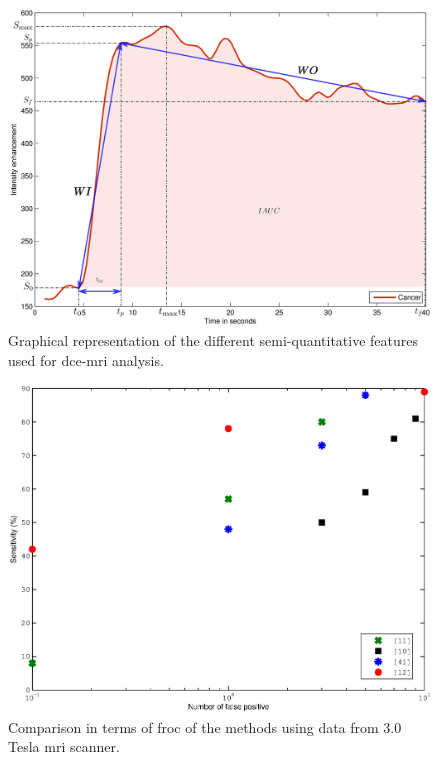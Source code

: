 
\begin{figure}
  \centering
  \includegraphics[width=.6\linewidth]{12_figures/figures/dce/dce_cancer_parameters.eps}
  \caption{Graphical representation of the different semi-quantitative features used for \ac{dce}-\ac{mri} analysis.}
  \label{fig:dceparam}
\end{figure}

\begin{figure}
  \centering
  \includegraphics[width=.5\linewidth]{12_figures/figures/froc/froc.eps}
  \caption{Comparison in terms of \ac{froc} of the methods using data from 3.0 Tesla \ac{mri} scanner.}
  \label{fig:froc}
\end{figure}


